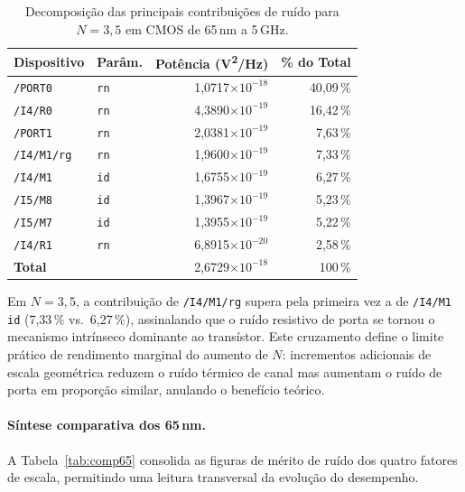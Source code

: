 \begin{table}[H]
\centering
\caption{Decomposição das principais contribuições de ruído para $N=3{,}5$ em CMOS de 65\,nm a
5\,GHz.}
\label{tab:noise65_N35}
\begin{tabular}{llrr}
\hline
\textbf{Dispositivo} & \textbf{Parâm.} & \textbf{Potência (V\textsuperscript{2}/Hz)} & \textbf{\% do Total} \\
\hline
\texttt{/PORT0}    & \texttt{rn} & 1{,}0717$\times 10^{-18}$ & 40{,}09\,\% \\
\texttt{/I4/R0}    & \texttt{rn} & 4{,}3890$\times 10^{-19}$ & 16{,}42\,\% \\
\texttt{/PORT1}    & \texttt{rn} & 2{,}0381$\times 10^{-19}$ & 7{,}63\,\%  \\
\texttt{/I4/M1/rg} & \texttt{rn} & 1{,}9600$\times 10^{-19}$ & 7{,}33\,\%  \\
\texttt{/I4/M1}    & \texttt{id} & 1{,}6755$\times 10^{-19}$ & 6{,}27\,\%  \\
\texttt{/I5/M8}    & \texttt{id} & 1{,}3967$\times 10^{-19}$ & 5{,}23\,\%  \\
\texttt{/I5/M7}    & \texttt{id} & 1{,}3955$\times 10^{-19}$ & 5{,}22\,\%  \\
\texttt{/I4/R1}    & \texttt{rn} & 6{,}8915$\times 10^{-20}$ & 2{,}58\,\%  \\
\hline
\textbf{Total}     &             & 2{,}6729$\times 10^{-18}$ & 100\,\%      \\
\hline
\end{tabular}
\end{table}

Em $N=3{,}5$, a contribuição de \texttt{/I4/M1/rg} supera pela primeira vez a de \texttt{/I4/M1 id}
(7{,}33\,\% vs.\ 6{,}27\,\%), assinalando que o ruído resistivo de porta se tornou o mecanismo
intrínseco dominante ao transístor. Este cruzamento define o limite prático de rendimento marginal
do aumento de $N$: incrementos adicionais de escala geométrica reduzem o ruído térmico de canal mas
aumentam o ruído de porta em proporção similar, anulando o benefício teórico.

\paragraph{Síntese comparativa dos 65\,nm.}

A Tabela~\ref{tab:comp65} consolida as figuras de mérito de ruído dos quatro fatores de escala,
permitindo uma leitura transversal da evolução do desempenho.

